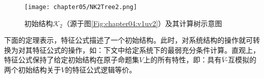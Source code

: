 \begin{example}
	
	
	\begin{figure}
		\centering
		\texttt{[image: chapter05/NK2Tree2.png]}
		\caption{初始结构$\mathcal{K}_2$（源于图\ref{Fig:chapter04:v1uv2}）及其计算树示意图}\label{fig:K2Tree}
	\end{figure}
	
	
\end{example}


下面的定理表示，特征公式描述了一个初始结构。此时，对系统结构的操作就可转换为对其特征公式的操作，如：下文中给定系统下的最弱充分条件计算。直观上，特征公式保持了给定初始结构在原子命题集$V$上的所有特性，即：具有$\overline{V}$-互模拟的两个初始结构关于$V$的特征公式逻辑等价。

